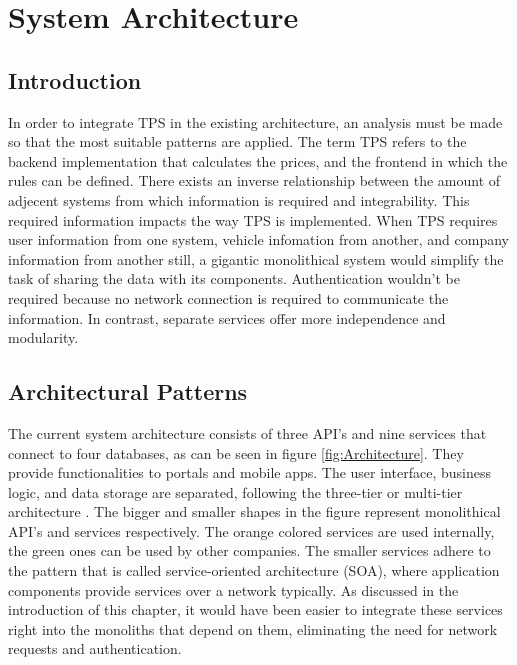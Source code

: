\graphicspath{{Chapter3/Figs/Vector/}{Chapter3/Figs/}}

%
\chapter{System Architecture}
\section{Introduction}
In order to integrate TPS in the existing architecture, an analysis must be made so that the most suitable patterns are applied. The term TPS refers to the backend implementation that calculates the prices, and the frontend in which the rules can be defined. There exists an inverse relationship between the amount of adjecent systems from which information is required and integrability. This required information impacts the way TPS is implemented. When TPS requires user information from one system, vehicle infomation from another, and company information from another still, a gigantic monolithical system would simplify the task of sharing the data with its components. Authentication wouldn't be required because no network connection is required to communicate the information. In contrast, separate services offer more independence and modularity.

%
\section{Architectural Patterns}
The current system architecture consists of three API's and nine services that connect to four databases, as can be seen in figure \ref{fig:Architecture}. They provide functionalities to portals and mobile apps. The user interface, business logic, and data storage are separated, following the three-tier or multi-tier architecture \cite{IBM-3-tier}. The bigger and smaller shapes in the figure represent monolithical API's and services respectively. The orange colored services are used internally, the green ones can be used by other companies. The smaller services adhere to the pattern that is called service-oriented architecture (SOA), where application components provide services over a network typically. As discussed in the introduction of this chapter, it would have been easier to integrate these services right into the monoliths that depend on them, eliminating the need for network requests and authentication.

